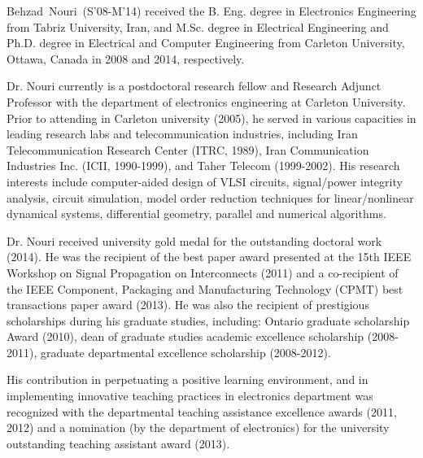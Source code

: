 \begin{IEEEbiography}{Behzad~Nouri~(S'08-M'14)} received the B. Eng. degree in Electronics Engineering from Tabriz University, Iran, and M.Sc. degree in Electrical Engineering and Ph.D. degree in Electrical and Computer Engineering from Carleton University, Ottawa, Canada in 2008 and 2014, respectively. \par 
 
Dr. Nouri currently is a postdoctoral research fellow and Research Adjunct Professor with the department of electronics engineering at Carleton University. Prior to attending in Carleton university (2005), he served in various capacities in leading research labs and telecommunication industries, including Iran Telecommunication Research Center (ITRC, 1989), Iran Communication Industries Inc. (ICII, 1990-1999), and Taher Telecom (1999-2002). His research interests include computer-aided design of VLSI circuits, signal/power integrity analysis, circuit simulation, model order reduction techniques for linear/nonlinear dynamical systems, differential geometry, parallel and numerical algorithms.  \par

Dr. Nouri received university gold medal for the outstanding doctoral work (2014). He was the recipient of the best paper award presented at the \mbox{15th} IEEE Workshop on Signal Propagation on Interconnects (2011) and a co-recipient of the IEEE Component, Packaging and Manufacturing Technology (CPMT) best transactions paper award (2013). He was also the recipient of prestigious scholarships during his graduate studies, including: Ontario graduate scholarship Award (2010), dean of graduate studies academic excellence scholarship (2008-2011), graduate departmental excellence scholarship (2008-2012)\@. \par

His  contribution in  perpetuating a positive learning  environment, and in implementing innovative teaching practices in electronics department was recognized with the departmental teaching assistance excellence awards (2011, 2012) and a nomination (by the department of electronics) for the university outstanding teaching assistant award (2013).
\end{IEEEbiography}
